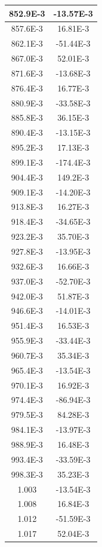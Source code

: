 \documentclass[english, 12pt, a4paper]{ifimaster}
\begin{document}
\begin{appendices}
\begin{center}
\begin{longtable}[htbp]{|c|c|}
\hline
  852.9E-3 & -13.57E-3 \\
\hline
  857.6E-3 & 16.81E-3 \\
\hline
  862.1E-3 & -51.44E-3 \\
\hline
  867.0E-3 & 52.01E-3 \\
\hline
  871.6E-3 & -13.68E-3 \\
\hline
  876.4E-3 & 16.77E-3 \\
\hline
  880.9E-3 & -33.58E-3 \\
\hline
  885.8E-3 & 36.15E-3 \\
\hline
  890.4E-3 & -13.15E-3 \\
\hline
  895.2E-3 & 17.13E-3 \\
\hline
  899.1E-3 & -174.4E-3 \\
\hline
  904.4E-3 & 149.2E-3 \\
\hline
  909.1E-3 & -14.20E-3 \\
\hline
  913.8E-3 & 16.27E-3 \\
\hline
  918.4E-3 & -34.65E-3 \\
\hline
  923.2E-3 & 35.70E-3 \\
\hline
  927.8E-3 & -13.95E-3 \\
\hline
  932.6E-3 & 16.66E-3 \\
\hline
  937.0E-3 & -52.70E-3 \\
\hline
  942.0E-3 & 51.87E-3 \\
\hline
  946.6E-3 & -14.01E-3 \\
\hline
  951.4E-3 & 16.53E-3 \\
\hline
  955.9E-3 & -33.44E-3 \\
\hline
  960.7E-3 & 35.34E-3 \\
\hline
  965.4E-3 & -13.54E-3 \\
\hline
  970.1E-3 & 16.92E-3 \\
\hline
  974.4E-3 & -86.94E-3 \\
\hline
  979.5E-3 & 84.28E-3 \\
\hline
  984.1E-3 & -13.97E-3 \\
\hline
  988.9E-3 & 16.48E-3 \\
\hline
  993.4E-3 & -33.59E-3 \\
\hline
  998.3E-3 & 35.23E-3 \\
\hline
  1.003 & -13.54E-3 \\
\hline
  1.008 & 16.84E-3 \\
\hline
  1.012 & -51.59E-3 \\
\hline
  1.017 & 52.04E-3 \\
\hline

\end{longtable}
\end{center}
\end{appendices}
\end{document}
